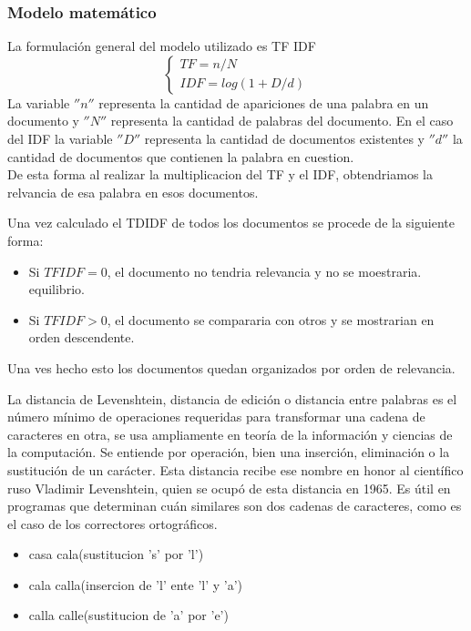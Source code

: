 \documentclass{beamer}
\begin{document}
\begin{frame}
\frametitle{Modelo matemático}
\begin{minipage}{10cm}
	La formulación general del modelo utilizado es TF IDF \\
	\begin{equation}\label{eq:general}
			\begin{cases}
			TF = n/N   \\
			IDF = log(1+D/d)
			\end{cases}
	\end{equation} 
	La variable $''n''$ representa la cantidad de apariciones de una palabra en un documento y $''N''$ representa la cantidad de palabras del documento. En el caso del IDF la variable $''D''$ representa la cantidad de documentos existentes y $''d''$ la cantidad de documentos que contienen la palabra en cuestion. \\
	De esta forma al realizar la multiplicacion del TF y el IDF, obtendriamos la relvancia de esa palabra en esos documentos.
\end{minipage}

\end{frame}	

\begin{frame}
	\begin{minipage}{10 cm}
		Una vez calculado el TDIDF de todos los documentos se procede de la siguiente forma:
		\begin{itemize}
			\item Si $TFIDF=0$, el documento no tendria relevancia y no se moestraria.
			equilibrio.
			\item Si $TFIDF > 0$, el documento se compararia con otros y se mostrarian en orden descendente.
		\end{itemize}
	Una ves hecho esto los documentos quedan organizados por orden de relevancia.
	\end{minipage}
\end{frame}

\begin{frame}
	\begin{minipage}{10 cm}
La distancia de Levenshtein, distancia de edición o distancia entre palabras es el número mínimo de operaciones requeridas para transformar una cadena de caracteres en otra, se usa ampliamente en teoría de la información y ciencias de la computación. Se entiende por operación, bien una inserción, eliminación o la sustitución de un carácter. Esta distancia recibe ese nombre en honor al científico ruso Vladimir Levenshtein, quien se ocupó de esta distancia en 1965. Es útil en programas que determinan cuán similares son dos cadenas de caracteres, como es el caso de los correctores ortográficos. 
		\begin{itemize}
			\item casa cala(sustitucion 's' por 'l')
			\item cala calla(insercion de 'l' ente 'l' y 'a')
                   \item  calla calle(sustitucion de 'a' por 'e')
		\end{itemize}
	\end{minipage}
\end{frame}
\end{document}
